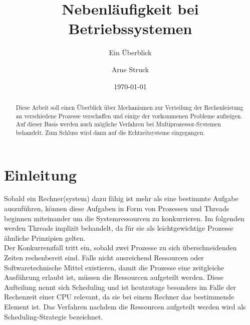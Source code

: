 \title{Nebenläufigkeit bei Betriebssystemen}
\subtitle{Ein Überblick}

\author{Arne Struck}

  
\date{\today}

\maketitle


\begin{abstract}
Diese Arbeit soll einen Überblick über Mechanismen zur Verteilung der Rechenleistung an verschiedene
Prozesse verschaffen und einige der vorkommenen Probleme aufzeigen. Auf dieser Basis werden auch mögliche Verfahren bei Multiprozessor-Systemen behandelt. Zum Schluss wird dann auf die Echtzeitsysteme eingegangen.
\end{abstract}

\tableofcontents
\newpage

\section{Einleitung}
Sobald ein Rechner(system) dazu fähig ist mehr als eine bestimmte Aufgabe auszuführen, können diese Aufgaben in Form von Prozessen und Threads beginnen miteinander um die Systemressourcen zu konkurrieren.
Im folgenden werden Threads implizit behandelt, da für sie als leichtgewichtige Prozesse ähnliche Prinzipien gelten. \\
Der Konkurrenzfall tritt ein, sobald zwei Prozesse zu sich überschneidenden Zeiten rechenbereit sind. Falls nicht ausreichend Ressourcen oder Softwaretechnische Mittel existieren, damit die Prozesse eine zeitgleiche Ausführung erlaubt ist, müssen die Ressourcen aufgeteilt werden. Diese Aufteilung nennt sich Scheduling und ist heutzutage besonders im Falle der Rechenzeit einer CPU relevant, da sie bei einem Rechner das bestimmende Element ist. Das Verfahren nachdem die Ressourcen aufgeteilt werden wird als Scheduling-Strategie bezeichnet. \\

